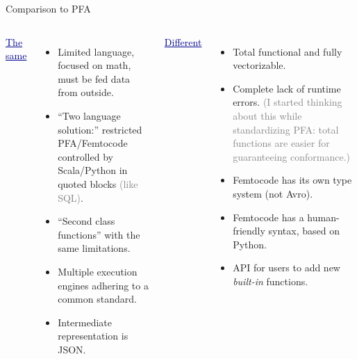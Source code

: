 \documentclass{beamer}
\begin{document}
\begin{frame}{Comparison to PFA}
\vspace{0.3 cm}
\begin{columns}[t]
\textcolor{darkblue}{\underline{The same}}

\begin{itemize}
\item Limited language, focused on math, must be fed data from outside.

\item ``Two language solution:'' restricted PFA/Femtocode controlled by Scala/Python in quoted blocks \textcolor{gray}{(like SQL)}.

\item ``Second class functions'' with the same limitations.

\item Multiple execution engines adhering to a common standard.

\item Intermediate representation is JSON.
\end{itemize}

\textcolor{darkblue}{\underline{Different}}

\begin{itemize}
\item Total functional and fully vectorizable.

\item Complete lack of runtime errors. \textcolor{gray}{\small (I started thinking about this while standardizing PFA: total functions are easier for guaranteeing conformance.)}

\item Femtocode has its own type system (not Avro).

\item Femtocode has a human-friendly syntax, based on Python.

\item API for users to add new {\it built-in} functions.
\end{itemize}

\end{columns}
\end{frame}
\end{document}
